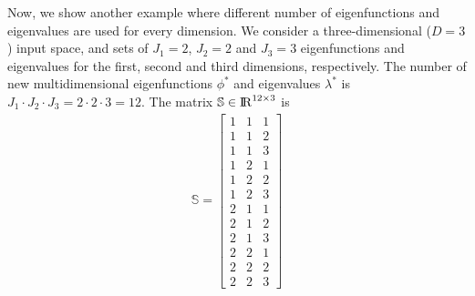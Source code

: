 \documentclass[]{interact}
\theoremstyle{plain}%
\theoremstyle{definition}
\theoremstyle{remark}
\begin{document}
Now, we show another example where different number of eigenfunctions and eigenvalues are used for every dimension. We consider a three-dimensional ($D=3$) input space, and sets of $J_{1}=2$, $J_{2}=2$ and $J_{3}=3$ eigenfunctions and eigenvalues for the first, second and third dimensions, respectively. The number of new multidimensional eigenfunctions $\phi^{\ast}$ and eigenvalues $\lambda^{\ast}$ is $J_{1}\cdot J_{2}\cdot J_{3}=2\cdot 2\cdot 3=12$. The matrix $\mathbb{S}\in {\rm I\!R}^{12 \times 3}$ is
%
\begin{eqnarray}
\mathbb{S}=
\left[ {\begin{array}{ccc}
1 & 1 & 1 \nonumber \\
1 & 1 & 2 \\
1 & 1 & 3 \\
1 & 2 & 1 \\
1 & 2 & 2 \\
1 & 2 & 3 \\
2 & 1 & 1 \\
2 & 1 & 2 \\
2 & 1 & 3 \\
2 & 2 & 1 \\
2 & 2 & 2 \\
2 & 2 & 3 
\end{array} } \right]
\end{eqnarray} 
\end{document}
